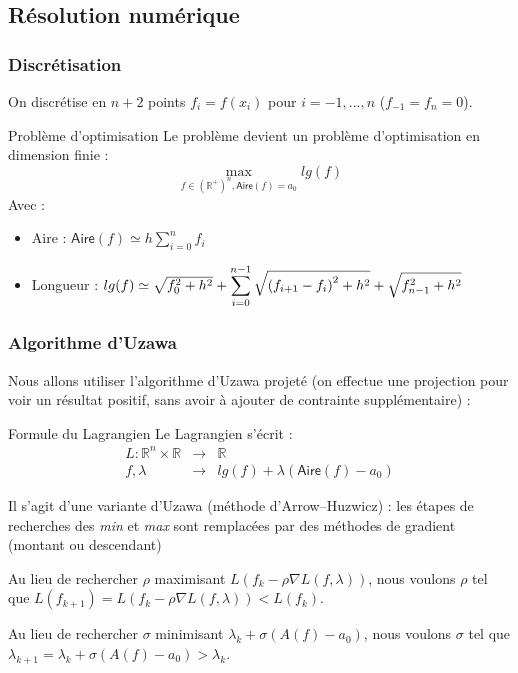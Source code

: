 \documentclass[11pt,envcountsect,aspectratio=169]{beamer} %
\newcommand{\R}{\mathbb{R}}
\newcommand{\A}{\mathsf{Aire}}
\begin{document}
\subsection{Résolution numérique}

\begin{frame}
    \frametitle{Discrétisation}

    On discrétise en $n+2$ points $f_i = f(x_i)$ pour $i=-1,...,n$ ($f_{-1}=f_n=0$).

    \begin{beamerboxesrounded}[upper=titreB,lower=texteB,shadow=true]{Problème d'optimisation}
        Le problème devient un problème d'optimisation en dimension finie :
        \[\max_{f \in \left(\R^+\right)^n, \A(f)=a_0} lg(f)\]
        Avec :
        \begin{itemize}
            \item Aire : $\A(f) \simeq h \sum_{i=0}^n{f_i}$
            \item Longueur : $lg(f) \simeq  \sqrt{f_0^2+h^2} + \displaystyle\sum_{i=0}^{n-1}{\sqrt{\vphantom{f_n^2}{(f_{i+1}-f_i)}^2+h^2}} + \sqrt{f_{n-1}^2+h^2} $
        \end{itemize}
    \end{beamerboxesrounded}

\end{frame}

\begin{frame}
    \frametitle{Algorithme d'Uzawa}
    
    Nous allons utiliser l'algorithme d'Uzawa projeté (on effectue une projection pour voir un résultat positif, sans avoir à ajouter de contrainte supplémentaire) :
    
    \begin{beamerboxesrounded}[upper=titreB,lower=texteB,shadow=true]{Formule du Lagrangien}
        Le Lagrangien s'écrit :
        \begin{eqnarray*}
            L \colon \R^n \times \R &\rightarrow & \R \\
            f, \lambda &\rightarrow & lg(f) + \lambda (\A(f)-a_0)
        \end{eqnarray*}
    \end{beamerboxesrounded}

    Il s'agit d'une variante d'Uzawa (méthode d'Arrow--Huzwicz) : les étapes de recherches des \emph{min} et \emph{max} sont remplacées par des méthodes de gradient (montant ou descendant)
    
    Au lieu de rechercher $\rho$ maximisant $L(f_k - \rho \nabla L(f,\lambda))$, nous voulons $\rho$ tel que $L(f_{k+1}) = L(f_k - \rho \nabla L(f,\lambda)) < L(f_k)$.
    
    Au lieu de rechercher $\sigma$ minimisant $\lambda_k + \sigma (A(f)-a_0)$, nous voulons $\sigma$ tel que $\lambda_{k+1} = \lambda_k + \sigma (A(f)-a_0) > \lambda_k$.

\end{frame}
\end{document}
